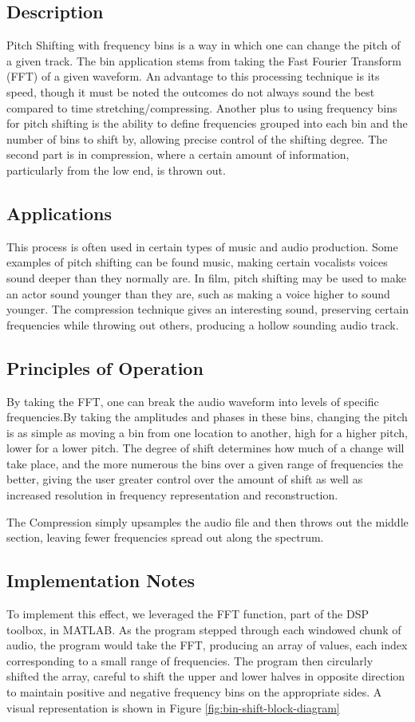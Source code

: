 \subsection{Description}
Pitch Shifting with frequency bins is a way in which one can change the pitch of a given track. The bin application stems from taking the Fast Fourier Transform (FFT) of a given waveform. An advantage to this processing technique is its speed, though it must be noted the outcomes do not always sound the best compared to time stretching/compressing. Another plus to using frequency bins for pitch shifting is the ability to define frequencies grouped into each bin and the number of bins to shift by, allowing precise control of the shifting degree. The second part is in compression, where a certain amount of information, particularly from the low end, is thrown out.

\subsection{Applications}
This process is often used in certain types of music and audio production. Some examples of pitch shifting can be found music, making certain vocalists voices sound deeper than they normally are. In film, pitch shifting may be used to make an actor sound younger than they are, such as making a voice higher to sound younger. The compression technique gives an interesting sound, preserving certain frequencies while throwing out others, producing a hollow sounding audio track.

\subsection{Principles of Operation}
By taking the FFT, one can break the audio waveform into levels of specific frequencies.By taking the amplitudes and phases in these bins, changing the pitch is as simple as moving a bin from one location to another, high for a higher pitch, lower for a lower pitch. The degree of shift determines how much of a change will take place, and the more numerous the bins over a given range of frequencies the better, giving the user greater control over the amount of shift as well as increased resolution in frequency representation and reconstruction. 

The Compression simply upsamples the audio file and then throws out the middle section, leaving fewer frequencies spread out along the spectrum. 

\subsection{Implementation Notes}
To implement this effect, we leveraged the FFT function, part of the DSP toolbox, in MATLAB. As the program stepped through each windowed chunk of audio, the program would take the FFT, producing an array of values, each index corresponding to a small range of frequencies. The program then circularly shifted the array, careful to shift the upper and lower halves in opposite direction to maintain positive and negative frequency bins on the appropriate sides. A visual representation is shown in Figure \ref{fig:bin-shift-block-diagram}

